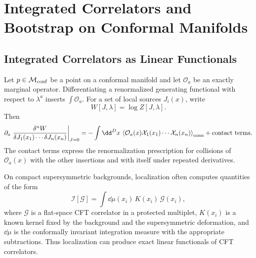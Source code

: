 \chapter{Integrated Correlators and Bootstrap on Conformal Manifolds}
\label{ch:volume-iii-integrated-correlators-bootstrap-conformal-manifolds}

\section{Integrated Correlators as Linear Functionals}

Let \(p\in\mathcal M_{\rm conf}\) be a point on a conformal manifold and let
\(\mathcal O_a\) be an exactly marginal operator.  Differentiating a
renormalized generating functional with respect to \(\lambda^a\) inserts
\(\int\mathcal O_a\).  For a set of local sources \(J_i(x)\), write
\[
  W[J,\lambda]=\log Z[J,\lambda].
\]
Then
\begin{equation}
  \partial_a
  \left.
  \frac{\delta^n W}{\delta J_1(x_1)\cdots\delta J_n(x_n)}
  \right|_{J=0}
  =
  -\int\dd^Dx\,
  \left\langle
    \mathcal O_a(x)\mathcal X_1(x_1)\cdots\mathcal X_n(x_n)
  \right\rangle_{\rm conn}
  +\text{contact terms}.
  \label{eq:coupling-derivative-integrated-insertion}
\end{equation}
The contact terms express the renormalization prescription for collisions of
\(\mathcal O_a(x)\) with the other insertions and with itself under repeated
derivatives.

On compact supersymmetric backgrounds, localization often computes quantities
of the form
\[
  \mathcal I[\mathcal G]
  =
  \int \dd\mu(x_i)\,K(x_i)\,\mathcal G(x_i),
\]
where \(\mathcal G\) is a flat-space CFT correlator in a protected multiplet,
\(K(x_i)\) is a known kernel fixed by the background and the supersymmetric
deformation, and \(\dd\mu\) is the conformally invariant integration measure
with the appropriate subtractions.  Thus localization can produce exact
linear functionals of CFT correlators.


